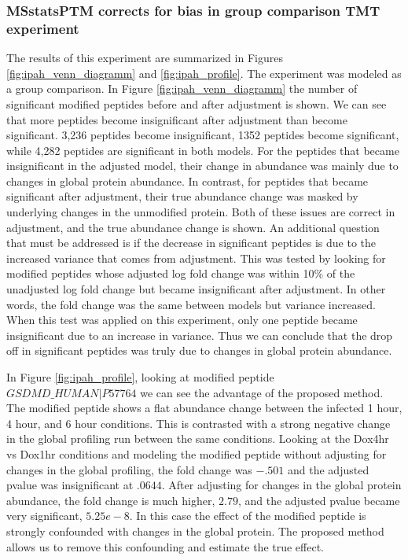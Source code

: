\documentclass[mcp]{article}
\numberwithin{table}{section}
\begin{document}
\subsubsection*{MSstatsPTM corrects for bias in group comparison TMT experiment}

The results of this experiment are summarized in Figures \ref{fig:ipah_venn_diagramm} and \ref{fig:ipah_profile}. The experiment was modeled as a group comparison. In Figure \ref{fig:ipah_venn_diagramm} the number of significant modified peptides before and after adjustment is shown. We can see that more peptides become insignificant after adjustment than become significant. 3,236 peptides become insignificant, 1352 peptides become significant, while 4,282 peptides are significant in both models. For the peptides that became insignificant in the adjusted model, their change in abundance was mainly due to changes in global protein abundance. In contrast, for peptides that became significant after adjustment, their true abundance change was masked by underlying changes in the unmodified protein. Both of these issues are correct in adjustment, and the true abundance change is shown. An additional question that must be addressed is if the decrease in significant peptides is due to the increased variance that comes from adjustment. This was tested by looking for modified peptides whose adjusted log fold change was within 10\% of the unadjusted log fold change but became insignificant after adjustment. In other words, the fold change was the same between models but variance increased. When this test was applied on this experiment, only one peptide became insignificant due to an increase in variance. Thus we can conclude that the drop off in significant peptides was truly due to changes in global protein abundance.

In Figure \ref{fig:ipah_profile}, looking at modified peptide $GSDMD\_HUMAN|P57764$ we can see the advantage of the proposed method. The modified peptide shows a flat abundance change between the infected 1 hour, 4 hour, and 6 hour conditions. This is contrasted with a strong negative change in the global profiling run between the same conditions. Looking at the Dox4hr vs Dox1hr conditions and modeling the modified peptide without adjusting for changes in the global profiling, the fold change was $-.501$ and the adjusted pvalue was insignificant at $.0644$. After adjusting for changes in the global protein abundance, the fold change is much higher, $2.79$, and the adjusted pvalue became very significant, $5.25e-8$. In this case the effect of the modified peptide is strongly confounded with changes in the global protein. The proposed method allows us to remove this confounding and estimate the true effect. 
\end{document}
